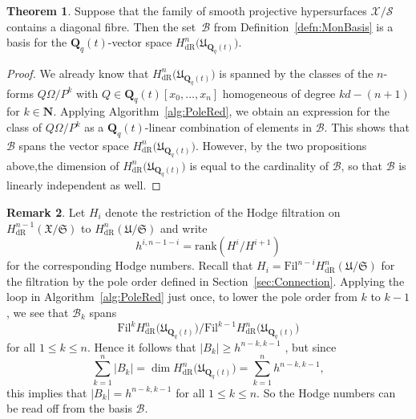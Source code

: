 \documentclass[a4paper,11pt]{article}
\numberwithin{equation}{section}
\providecommand{\card}[1]{\lvert#1\rvert}                %
\newcommand{\NN}{\mathbf{N}} %
\newcommand{\QQ}{\mathbf{Q}} %
\providecommand{\HdR}{H_{\text{dR}}}    %
\providecommand{\cB}{\mathcal{B}} %
\theoremstyle{definition}
\newtheorem{thm}{Theorem}[section]
\newtheorem{rem}[thm]{Remark}
\begin{document}
\begin{thm} \label{thm:Basis}
Suppose that the family of smooth projective hypersurfaces 
$\mathcal{X}/\mathcal{S}$ contains a diagonal fibre.  Then the 
set~$\cB$ from Definition~\ref{defn:MonBasis} is a basis for 
the $\QQ_q(t)$-vector space $\HdR^n\bigl(\mathfrak{U}_{\QQ_q(t)}\bigr)$.
\end{thm}

\begin{proof}
We already know that $\HdR^n\bigl(\mathfrak{U}_{\QQ_q(t)}\bigr)$ is 
spanned by the classes of the $n$-forms $Q \Omega / P^k$ with 
$Q \in \QQ_q(t)[x_0, \dotsc, x_n]$ homogeneous of degree 
$kd - (n+1)$ for $k \in \NN$. Applying Algorithm~\ref{alg:PoleRed}, we 
obtain an expression for the class of $Q \Omega / P^k$ as a 
$\QQ_q(t)$-linear combination of elements in $\cB$.  This shows that 
$\cB$ spans the vector space $\HdR^n\bigl(\mathfrak{U}_{\QQ_q(t)}\bigr)$. 
However, by the two propositions above,the dimension of 
$\HdR^n\bigl(\mathfrak{U}_{\QQ_q(t)}\bigr)$ is equal to the cardinality of
$\cB$, so that $\cB$ is linearly independent as well.
\end{proof}

\begin{rem} \label{rem:hnumbers}
Let $H_i$ denote the restriction of the Hodge filtration on 
$\HdR^{n-1}(\mathfrak{X}/\mathfrak{S})$ to $\HdR^{n}(\mathfrak{U}/\mathfrak{S})$
and write 
\[
h^{i,n-1-i}=\mbox{rank}(H^i/H^{i+1})
\] 
for the corresponding Hodge numbers.
Recall that $H_i=\mbox{Fil}^{n-i} \HdR^{n}(\mathfrak{U}/\mathfrak{S})$
for the filtration by the pole order defined in Section~\ref{sec:Connection}. Applying 
the loop in Algorithm~\ref{alg:PoleRed} just once, to lower the pole 
order from $k$ to $k-1$, we see that $\cB_k$ spans 
\[
\mbox{Fil}^{k} \HdR^{n}\bigl(\mathfrak{U}_{\QQ_q(t)}\bigr) / \mbox{Fil}^{k-1} \HdR^{n}\bigl(\mathfrak{U}_{\QQ_q(t)}\bigr)
\]
for all $1 \leq k \leq n$. Hence it follows that $\card{B_k} \geq h^{n-k,k-1}$ , but since
\[
\sum_{k=1}^n \card{B_k} = \dim \HdR^n\bigl(\mathfrak{U}_{\QQ_q(t)}\bigr) = \sum_{k=1}^n h^{n-k,k-1},
\] 
this implies that $\card{B_k} = h^{n-k,k-1}$ for all $1 \leq k \leq n$. So the Hodge numbers
can be read off from the basis $\cB$.
\end{rem}
\end{document}
